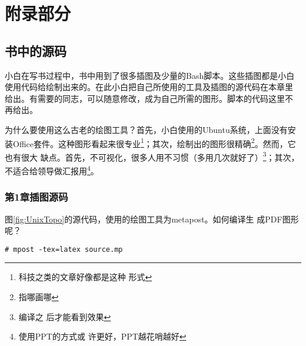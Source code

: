\part{附录部分}
\chapter{书中的源码}
\label{chap:sourceCode}

小白在写书过程中，书中用到了很多插图及少量的Bash脚本。这些插图都是小白
使用代码给绘制出来的。在此小白把自己所使用的工具及插图的源代码在本章里
给出。有需要的同志，可以随意修改，成为自己所需的图形。脚本的代码这里不
再给出。

为什么要使用这么古老的绘图工具？首先，小白使用的Ubuntu系统，上面没有安
装Office套件。这种图形看起来很专业\footnote{科技之类的文章好像都是这种
  形式}；其次，绘制出的图形很精确\footnote{指哪画哪}。然而，它也有很大
缺点。首先，不可视化，很多人用不习惯（多用几次就好了）\footnote{编译之
  后才能看到效果}；其次，不适合给领导做汇报用\footnote{使用PPT的方式或
  许更好，PPT越花哨越好}。

\section{第1章插图源码}

图\ref{fig:UnixTopo}的源代码，使用的绘图工具为metapost。如何编译生
成PDF图形呢？

\begin{verbatim}
# mpost -tex=latex source.mp
\end{verbatim}

